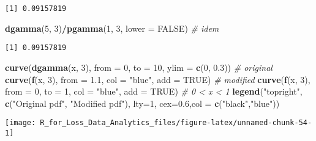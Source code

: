 \documentclass[]{book}
\newenvironment{Shaded}{\begin{snugshade}}{\end{snugshade}}
\newcommand{\KeywordTok}[1]{\textcolor[rgb]{0.13,0.29,0.53}{\textbf{#1}}}
\newcommand{\DataTypeTok}[1]{\textcolor[rgb]{0.13,0.29,0.53}{#1}}
\newcommand{\DecValTok}[1]{\textcolor[rgb]{0.00,0.00,0.81}{#1}}
\newcommand{\FloatTok}[1]{\textcolor[rgb]{0.00,0.00,0.81}{#1}}
\newcommand{\StringTok}[1]{\textcolor[rgb]{0.31,0.60,0.02}{#1}}
\newcommand{\CommentTok}[1]{\textcolor[rgb]{0.56,0.35,0.01}{\textit{#1}}}
\newcommand{\OtherTok}[1]{\textcolor[rgb]{0.56,0.35,0.01}{#1}}
\newcommand{\OperatorTok}[1]{\textcolor[rgb]{0.81,0.36,0.00}{\textbf{#1}}}
\newcommand{\NormalTok}[1]{#1}
\theoremstyle{definition}
\theoremstyle{definition}
\theoremstyle{definition}
\theoremstyle{remark}
\begin{document}
\begin{verbatim}
[1] 0.09157819
\end{verbatim}

\begin{Shaded}
\begin{Highlighting}[]
\KeywordTok{dgamma}\NormalTok{(}\DecValTok{5}\NormalTok{, }\DecValTok{3}\NormalTok{)}\OperatorTok{/}\KeywordTok{pgamma}\NormalTok{(}\DecValTok{1}\NormalTok{, }\DecValTok{3}\NormalTok{, }\DataTypeTok{lower =} \OtherTok{FALSE}\NormalTok{) }\CommentTok{# idem}
\end{Highlighting}
\end{Shaded}

\begin{verbatim}
[1] 0.09157819
\end{verbatim}

\begin{Shaded}
\begin{Highlighting}[]
\KeywordTok{curve}\NormalTok{(}\KeywordTok{dgamma}\NormalTok{(x, }\DecValTok{3}\NormalTok{), }\DataTypeTok{from =} \DecValTok{0}\NormalTok{, }\DataTypeTok{to =} \DecValTok{10}\NormalTok{, }\DataTypeTok{ylim =} \KeywordTok{c}\NormalTok{(}\DecValTok{0}\NormalTok{, }\FloatTok{0.3}\NormalTok{))    }\CommentTok{# original}
\KeywordTok{curve}\NormalTok{(}\KeywordTok{f}\NormalTok{(x, }\DecValTok{3}\NormalTok{), }\DataTypeTok{from =} \FloatTok{1.1}\NormalTok{, }\DataTypeTok{col =} \StringTok{"blue"}\NormalTok{, }\DataTypeTok{add =} \OtherTok{TRUE}\NormalTok{)        }\CommentTok{# modified}
\KeywordTok{curve}\NormalTok{(}\KeywordTok{f}\NormalTok{(x, }\DecValTok{3}\NormalTok{), }\DataTypeTok{from =} \DecValTok{0}\NormalTok{, }\DataTypeTok{to =} \DecValTok{1}\NormalTok{, }\DataTypeTok{col =} \StringTok{"blue"}\NormalTok{, }\DataTypeTok{add =} \OtherTok{TRUE}\NormalTok{)  }\CommentTok{# 0 < x < 1}
\KeywordTok{legend}\NormalTok{(}\StringTok{"topright"}\NormalTok{, }\KeywordTok{c}\NormalTok{(}\StringTok{"Original pdf"}\NormalTok{, }\StringTok{"Modified pdf"}\NormalTok{), }\DataTypeTok{lty=}\DecValTok{1}\NormalTok{, }\DataTypeTok{cex=}\FloatTok{0.6}\NormalTok{,}\DataTypeTok{col =} \KeywordTok{c}\NormalTok{(}\StringTok{"black"}\NormalTok{,}\StringTok{"blue"}\NormalTok{))}
\end{Highlighting}
\end{Shaded}

\begin{center}\texttt{[image: R\_for\_Loss\_Data\_Analytics\_files/figure-latex/unnamed-chunk-54-1]} \end{center}
\end{document}
